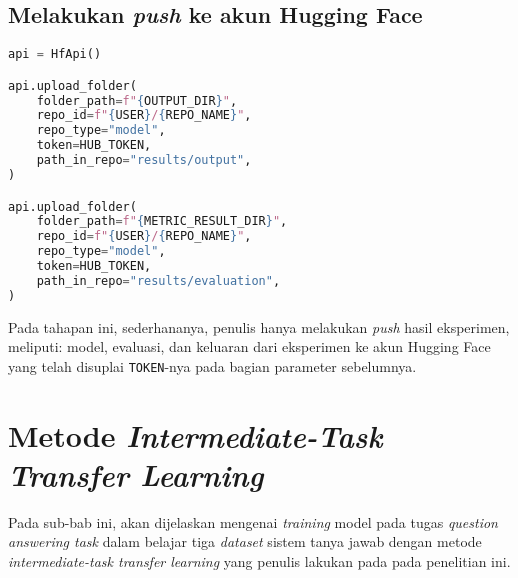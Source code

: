 \subsection{Melakukan \emph{push} ke akun Hugging Face}
\begin{lstlisting}[language=Python, caption=Melakukan \emph{push} ke akun Hugging Face]
api = HfApi()

api.upload_folder(
    folder_path=f"{OUTPUT_DIR}",
    repo_id=f"{USER}/{REPO_NAME}",
    repo_type="model",
    token=HUB_TOKEN,
    path_in_repo="results/output",
)

api.upload_folder(
    folder_path=f"{METRIC_RESULT_DIR}",
    repo_id=f"{USER}/{REPO_NAME}",
    repo_type="model",
    token=HUB_TOKEN,
    path_in_repo="results/evaluation",
)
\end{lstlisting}

Pada tahapan ini, sederhananya, penulis hanya melakukan \emph{push} hasil eksperimen, meliputi: model, evaluasi, dan keluaran dari eksperimen ke akun Hugging Face yang telah disuplai \texttt{TOKEN}-nya pada bagian parameter sebelumnya.

\section{Metode \emph{Intermediate-Task Transfer Learning}}
Pada sub-bab ini, akan dijelaskan mengenai \emph{training} model pada tugas \emph{question answering task} dalam belajar tiga \emph{dataset} sistem tanya jawab dengan metode \emph{intermediate-task transfer learning} yang penulis lakukan pada pada penelitian ini.

